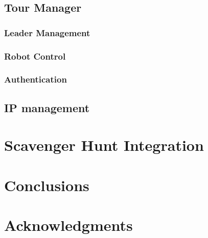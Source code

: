 \documentclass{sig-alternate-05-2015}
\begin{document}
\subsection{Tour Manager}

\subsubsection{Leader Management}

\subsubsection{Robot Control}

\subsubsection{Authentication}

\subsection{IP management}

\section{Scavenger Hunt Integration}

\section{Conclusions}

\section{Acknowledgments}


\end{document}
